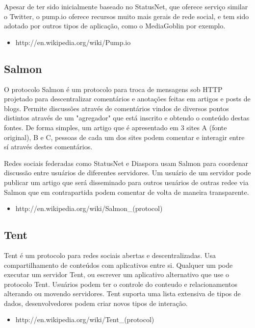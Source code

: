 \documentclass[12pt]{article}
\begin{document}
Apesar de ter sido inicialmente baseado no StatusNet, que oferece serviço
similar o Twitter, o pump.io oferece recursos muito mais gerais de rede
social, e tem sido adotado por outros tipos de aplicação, como o MediaGoblin
por exemplo.

\begin{itemize}
  \item http://en.wikipedia.org/wiki/Pump.io
\end{itemize}

\subsection{Salmon}

O protocolo Salmon é um protocolo para troca de mensagens sob HTTP projetado
para descentralizar comentários e anotações feitas em artigos e posts de
blogs. Permite discussões através de comentários vindos de diversos pontos
distintos através de um "agregador" que está inscrito e obtendo o conteúdo
destas fontes. De forma simples, um artigo que é apresentado em 3 sites A
(fonte original), B e C, pessoas de cada um dos sites podem comentar e
interagir entre sí através destes comentários.

Redes sociais federadas como StatusNet e Diaspora usam Salmon para coordenar
discussão entre usuários de diferentes servidores. Um usuário de um servidor
pode publicar um artigo que será disseminado para outros usuários de outras
redee via Salmon que em contrapartida podem comentar de volta de maneira
transparente.

\begin{itemize}
  \item http://en.wikipedia.org/wiki/Salmon\_(protocol)
\end{itemize}

\subsection{Tent}

Tent é um protocolo para redes sociais abertas e descentralizadas. Usa
compartilhamento de conteúdos com aplicativos entre si. Qualquer um pode
executar um servidor Tent, ou escrever um aplicativo alternativo que use o
protocolo Tent. Usuários podem ter o controle do conteudo e relacionamentos
alterando ou movendo servidores. Tent suporta uma lista extensiva de tipos de
dados, desenvolvedores podem criar novos tipos de interação.

\begin{itemize}
  \item http://en.wikipedia.org/wiki/Tent\_(protocol)
\end{itemize}
\end{document}
